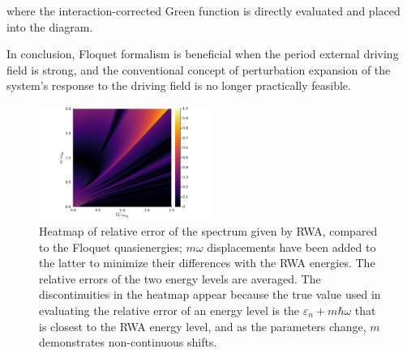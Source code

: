 \documentclass[hyperref, a4paper]{article}
\begin{document}
where the interaction-corrected Green function is directly evaluated 
and placed into the diagram.

In conclusion, Floquet formalism is beneficial when the period external driving field is strong, 
and the conventional concept of perturbation expansion 
of the system's response to the driving field 
is no longer practically feasible.

\begin{figure}
    \centering
    \includegraphics[width=0.5\textwidth]{plot/relative-error-rwa.pdf}
    \caption{Heatmap of relative error of the spectrum given by RWA, 
    compared to the Floquet quasienergies; 
    $m \omega$ displacements have been added to the latter 
    to minimize their differences with the RWA energies.
    The relative errors of the two energy levels are averaged.
    The discontinuities in the heatmap appear because the true value used in 
    evaluating the relative error of an energy level  
    is the $\varepsilon_n + m \hbar \omega$ 
    that is closest to the RWA energy level, 
    and as the parameters change, $m$ demonstrates non-continuous shifts.}
    \label{fig:rwa-floquet}
\end{figure}
\end{document}
